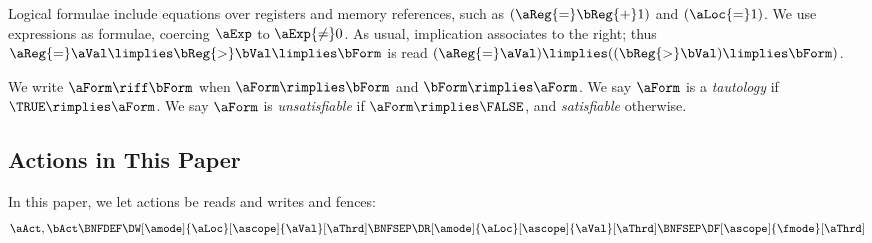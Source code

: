 Logical formulae include equations over registers and memory references, such as
$(\aReg{=}\bReg{+}1)$ and $(\aLoc{=}1)$.
We use expressions as formulae, coercing $\aExp$ to $\aExp{\neq}0$.
As usual, implication associates to the right; thus
$\aReg{=}\aVal\limplies\bReg{>}\bVal\limplies\bForm$ is read
$(\aReg{=}\aVal)\limplies((\bReg{>}\bVal)\limplies\bForm)$.


We write $\aForm\riff\bForm$ when $\aForm\rimplies\bForm$ and $\bForm\rimplies\aForm$.
We say
$\aForm$ is a \emph{tautology} if $\TRUE \rimplies \aForm$.
We say
$\aForm$ is \emph{unsatisfiable} if $\aForm \rimplies \FALSE$, and
\emph{satisfiable} otherwise.




\subsection{Actions in This Paper}
\label{sec:actions}
In this paper, we let actions be reads and writes and fences:
\begin{displaymath}
  \aAct,\bAct \BNFDEF \DW[\amode]{\aLoc}[\ascope]{\aVal}[\aThrd]
  \BNFSEP \DR[\amode]{\aLoc}[\ascope]{\aVal}[\aThrd]
  \BNFSEP \DF[\ascope]{\fmode}[\aThrd]
\end{displaymath}

